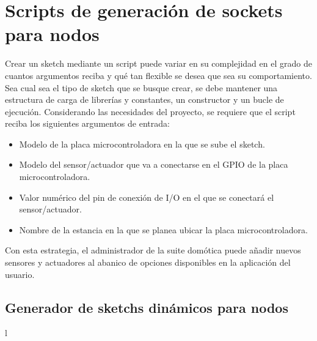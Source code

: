 \section{Scripts de generación de sockets para nodos}
\label{ch:Capitulo4.3.1}

Crear un \gls{sketch} mediante un script puede variar en su complejidad en el grado de cuantos argumentos reciba y qué tan flexible se desea que sea su comportamiento. Sea cual sea el tipo de \gls{sketch} que se busque crear, se debe mantener una estructura de carga de librerías y constantes, un constructor y un bucle de ejecución. Considerando las necesidades del proyecto, se requiere que el script reciba los siguientes argumentos de entrada:

\begin{itemize}
  \item Modelo de la placa microcontroladora en la que se sube el \gls{sketch}.

  \item Modelo del sensor/actuador que va a conectarse en el GPIO de la placa microcontroladora.

  \item Valor numérico del pin de conexión de I/O en el que se conectará el sensor/actuador.
  
  \item Nombre de la estancia en la que se planea ubicar la placa microcontroladora.
\end{itemize}

Con esta estrategia, el administrador de la suite domótica puede añadir nuevos sensores y actuadores al abanico de opciones disponibles en la aplicación del usuario.

\subsection{Generador de sketchs dinámicos para nodos}
l\label{ch:Capitulo4.3.2}

